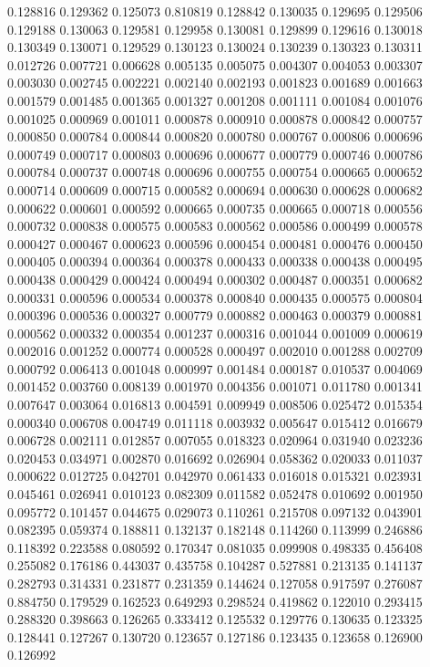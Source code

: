 0.128816
0.129362
0.125073
0.810819
0.128842
0.130035
0.129695
0.129506
0.129188
0.130063
0.129581
0.129958
0.130081
0.129899
0.129616
0.130018
0.130349
0.130071
0.129529
0.130123
0.130024
0.130239
0.130323
0.130311
0.012726
0.007721
0.006628
0.005135
0.005075
0.004307
0.004053
0.003307
0.003030
0.002745
0.002221
0.002140
0.002193
0.001823
0.001689
0.001663
0.001579
0.001485
0.001365
0.001327
0.001208
0.001111
0.001084
0.001076
0.001025
0.000969
0.001011
0.000878
0.000910
0.000878
0.000842
0.000757
0.000850
0.000784
0.000844
0.000820
0.000780
0.000767
0.000806
0.000696
0.000749
0.000717
0.000803
0.000696
0.000677
0.000779
0.000746
0.000786
0.000784
0.000737
0.000748
0.000696
0.000755
0.000754
0.000665
0.000652
0.000714
0.000609
0.000715
0.000582
0.000694
0.000630
0.000628
0.000682
0.000622
0.000601
0.000592
0.000665
0.000735
0.000665
0.000718
0.000556
0.000732
0.000838
0.000575
0.000583
0.000562
0.000586
0.000499
0.000578
0.000427
0.000467
0.000623
0.000596
0.000454
0.000481
0.000476
0.000450
0.000405
0.000394
0.000364
0.000378
0.000433
0.000338
0.000438
0.000495
0.000438
0.000429
0.000424
0.000494
0.000302
0.000487
0.000351
0.000682
0.000331
0.000596
0.000534
0.000378
0.000840
0.000435
0.000575
0.000804
0.000396
0.000536
0.000327
0.000779
0.000882
0.000463
0.000379
0.000881
0.000562
0.000332
0.000354
0.001237
0.000316
0.001044
0.001009
0.000619
0.002016
0.001252
0.000774
0.000528
0.000497
0.002010
0.001288
0.002709
0.000792
0.006413
0.001048
0.000997
0.001484
0.000187
0.010537
0.004069
0.001452
0.003760
0.008139
0.001970
0.004356
0.001071
0.011780
0.001341
0.007647
0.003064
0.016813
0.004591
0.009949
0.008506
0.025472
0.015354
0.000340
0.006708
0.004749
0.011118
0.003932
0.005647
0.015412
0.016679
0.006728
0.002111
0.012857
0.007055
0.018323
0.020964
0.031940
0.023236
0.020453
0.034971
0.002870
0.016692
0.026904
0.058362
0.020033
0.011037
0.000622
0.012725
0.042701
0.042970
0.061433
0.016018
0.015321
0.023931
0.045461
0.026941
0.010123
0.082309
0.011582
0.052478
0.010692
0.001950
0.095772
0.101457
0.044675
0.029073
0.110261
0.215708
0.097132
0.043901
0.082395
0.059374
0.188811
0.132137
0.182148
0.114260
0.113999
0.246886
0.118392
0.223588
0.080592
0.170347
0.081035
0.099908
0.498335
0.456408
0.255082
0.176186
0.443037
0.435758
0.104287
0.527881
0.213135
0.141137
0.282793
0.314331
0.231877
0.231359
0.144624
0.127058
0.917597
0.276087
0.884750
0.179529
0.162523
0.649293
0.298524
0.419862
0.122010
0.293415
0.288320
0.398663
0.126265
0.333412
0.125532
0.129776
0.130635
0.123325
0.128441
0.127267
0.130720
0.123657
0.127186
0.123435
0.123658
0.126900
0.126992
